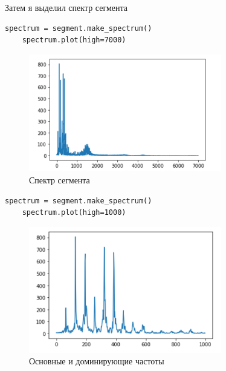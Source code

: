 \documentclass[a4paper,12pt]{article}
\begin{document}
\begin{enumerate}
Затем я выделил спектр сегмента
\begin{lstlisting}[caption=Спектр сегмента]
	spectrum = segment.make_spectrum()
	spectrum.plot(high=7000)
\end{lstlisting}
\begin{figure}[H]
	\centering
	\includegraphics[width=0.75\textwidth]{2_4.png}
	\caption{Спектр сегмента}
	\label{fig:2.4}
\end{figure}
\begin{lstlisting}[caption=Основные и доминирующие частоты]
	spectrum = segment.make_spectrum()
	spectrum.plot(high=1000)
\end{lstlisting}
\begin{figure}[H]
	\centering
	\includegraphics[width=0.75\textwidth]{2_5.png}
	\caption{Основные и доминирующие частоты}
	\label{fig:2.5}
\end{figure}
\end{enumerate}
\end{document}
